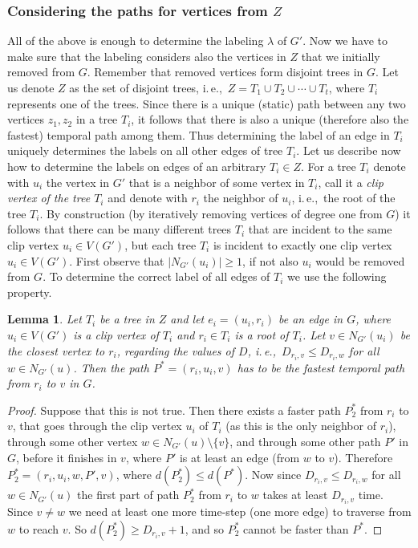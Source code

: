 \documentclass[11pt,a4paper]{article}
\newtheorem{lemma}[theorem]{Lemma}
\theoremstyle{remark}
\theoremstyle{definition}
\newcommand{\ie}{i.\,e.,\ }
\begin{document}
\subsubsection*{\boldmath Considering the paths for vertices from $Z$}
All of the above is enough to determine the labeling $\lambda$ of $G'$. Now we have to make sure that the labeling considers also the vertices in $Z$ that we initially removed from $G$.
Remember that removed vertices form disjoint trees in $G$.
Let us denote $Z$ as the set of disjoint trees, \ie $Z = T_1 \cup T_2 \cup \cdots \cup T_t$, where $T_i$ represents one of the trees.
Since there is a unique (static) path between any two vertices $z_1, z_2$ in a tree $T_i$,
it follows that there is also a unique (therefore also the fastest) temporal path among them.
Thus determining the label of an edge in $T_i$ uniquely determines the labels on all other edges of tree $T_i$.
Let us describe now how to determine the labels on edges of an arbitrary $T_i \in Z$.
For a tree $T_i$ denote with $u_i$ the vertex in $G'$ that is a neighbor of some vertex in $T_i$, 
call it a \emph{clip vertex of the tree $T_i$}
and denote with $r_i$ the neighbor of $u_i$, \ie the root of the tree $T_i$.
By construction (by iteratively removing vertices of degree one from $G$) it follows that there can be many different trees $T_i$ that are incident to the same clip vertex $u_i \in V(G')$,
but each tree $T_i$ is incident to exactly one clip vertex $u_i \in V(G')$.
First observe that $|N_{G'}(u_i)|\geq 1$, if not also $u_i$ would be removed from $G$.
To determine the correct label of all edges of $T_i$ we use the following property.
\begin{lemma}
Let $T_i$ be a tree in $Z$ and let $e_i = (u_i,r_i)$ be an edge in $G$, where $u_i \in V(G')$ is a clip vertex of $T_i$ and $r_i \in T_i$ is a root of $T_i$.
Let $v \in N_{G'}(u_i)$ be the closest vertex to $r_i$, regarding the values of $D$, \ie  $D_{r_i,v} \leq D_{r_i,w}$ for all $w \in N_{G'}(u)$.
Then the path $P^*=(r_i,u_i,v)$ has to be the fastest temporal path from $r_i$ to $v$ in $G$.
\end{lemma}
\begin{proof}
Suppose that this is not true.
Then there exists a faster path $P^*_2$ from $r_i$ to $v$, that goes through the clip vertex $u_i$ of $T_i$ (as this is the only neighbor of $r_i$), through some other vertex $w \in N_{G'}(u) \setminus \{v \}$, 
and through some other path $P'$ in $G$, before it finishes in $v$, where $P'$ is at least an edge (from $w$ to $v$). 
Therefore $P^*_2= (r_i,u_i,w,P',v)$, where $d(P^*_2) \leq d(P^*)$.
Now since $D_{r_i,v} \leq D_{r_i,w}$ for all $ w\in N_{G'}(u)$ the first part of path $P^*_2$ from $r_i$ to $w$ takes at least $D_{r_i,v}$ time.
Since $v \neq w$ we need at least one more time-step (one more edge) to traverse from $w$ to reach $v$. 
So $d(P^*_2) \geq D_{r_i,v} + 1$, and so $P^*_2$ cannot be faster than $P^*$.
\end{proof}
\end{document}
